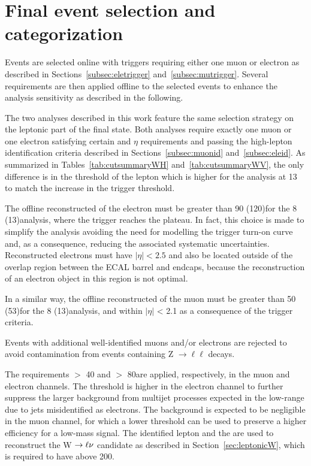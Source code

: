 \section{Final event selection and categorization}\label{sec:finalselection}

Events are selected online with triggers requiring either one muon or electron as described in Sections~\ref{subsec:eletrigger} and~\ref{subsec:mutrigger}.
Several requirements are then applied offline to the selected events to enhance the analysis sensitivity as described in the following.

The two analyses described in this work feature the same selection strategy on the leptonic part of the final state.
Both analyses require exactly one muon or one electron satisfying certain \pt and $\eta$ requirements and passing 
the high-\pt lepton identification criteria described in Sections~\ref{subsec:muonid} and~\ref{subsec:eleid}.
As summarized in Tables~\ref{tab:cutsummaryWH} and~\ref{tab:cutsummaryWV}, the only difference is in the \pt threshold of the lepton which is higher for the analysis at 13\TeV
to match the increase in the trigger threshold.

The offline reconstructed \pt of the electron must be greater than 90 (120)\GeV for the 8 (13)\TeV analysis, where the trigger reaches the plateau.
In fact, this choice is made to simplify the analysis avoiding the need for modelling the trigger turn-on curve and, as a consequence, reducing the associated systematic uncertainties.
Reconstructed electrons must have $|\eta| < 2.5$ and also be located outside of the overlap region between the ECAL barrel and endcaps, because the reconstruction of an electron object in
this region is not optimal.

In a similar way, the offline reconstructed \pt of the muon must be greater than 50 (53)\GeV for the 8 (13)\TeV analysis, and within $|\eta|$ < 2.1 as a consequence of the trigger criteria.

Events with additional well-identified muons and/or electrons are rejected to avoid contamination from events containing Z $\rightarrow\ell\ell$ decays.

The requirements \ETmiss $>$ 40 and $>$ 80\GeV are applied, respectively, in the muon and electron channels.
The threshold is higher in the electron channel to further suppress the larger background from multijet processes expected in the low-\ETmiss range due to jets misidentified as electrons.
The background is expected to be negligible in the muon channel, for which a lower \ETmiss threshold can be used to preserve a higher efficiency for a low-mass signal.
The identified lepton and the \ETmiss are used to reconstruct the W $\rightarrow\ell\nu$ candidate as described in Section~\ref{sec:leptonicW},
which is required to have \pt above 200\GeV.\\

